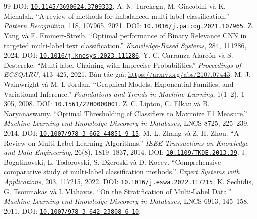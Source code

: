 \documentclass[11pt,a4paper]{article}
\newcommand{\doi}[1]{\href{https://doi.org/#1}{\nolinkurl{#1}}}
\begin{document}
\begin{thebibliography}{99}
DOI: \doi{10.1145/3690624.3709333}.
 A. N. Tarekegn, M. Giacobini và K. Michalak.
“A review of methods for imbalanced multi-label classification.”
\emph{Pattern Recognition}, 118, 107965, 2021.
DOI: \doi{10.1016/j.patcog.2021.107965}.
 Z. Yang và F. Emmert-Streib.
“Optimal performance of Binary Relevance CNN in targeted multi-label text classification.”
\emph{Knowledge-Based Systems}, 284, 111286, 2024.
DOI: \doi{10.1016/j.knosys.2023.111286}.
 Y. C. Carranza Alarcón và S. Destercke.
“Multi-label Chaining with Imprecise Probabilities.”
\emph{Proceedings of ECSQARU}, 413--426, 2021.
Bản tác giả: \url{https://arxiv.org/abs/2107.07443}.
 M. J. Wainwright và M. I. Jordan.
“Graphical Models, Exponential Families, and Variational Inference.”
\emph{Foundations and Trends in Machine Learning}, 1(1--2), 1--305, 2008.
DOI: \doi{10.1561/2200000001}.
 Z. C. Lipton, C. Elkan và B. Naryanaswamy.
“Optimal Thresholding of Classifiers to Maximize F1 Measure.”
\emph{Machine Learning and Knowledge Discovery in Databases}, LNCS 8725, 225--239, 2014.
DOI: \doi{10.1007/978-3-662-44851-9_15}.
 M.-L. Zhang và Z.-H. Zhou.
“A Review on Multi-Label Learning Algorithms.”
\emph{IEEE Transactions on Knowledge and Data Engineering}, 26(8), 1819--1837, 2014.
DOI: \doi{10.1109/TKDE.2013.39}.
 J. Bogatinovski, L. Todorovski, S. Džeroski và D. Kocev.
“Comprehensive comparative study of multi-label classification methods.”
\emph{Expert Systems with Applications}, 203, 117215, 2022.
DOI: \doi{10.1016/j.eswa.2022.117215}.
 K. Sechidis, G. Tsoumakas và I. Vlahavas.
“On the Stratification of Multi-Label Data.”
\emph{Machine Learning and Knowledge Discovery in Databases}, LNCS 6913, 145--158, 2011.
DOI: \doi{10.1007/978-3-642-23808-6_10}.
\end{thebibliography}
\end{document}
